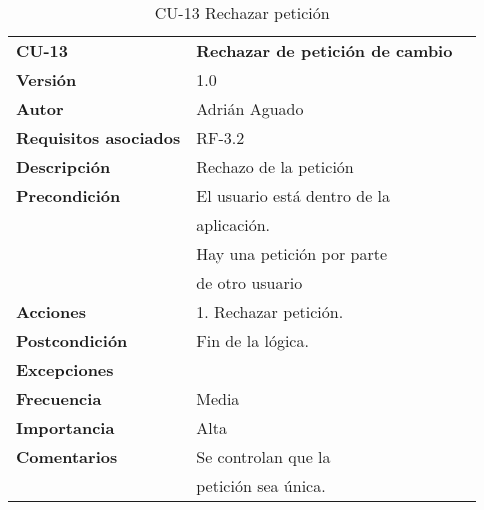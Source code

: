 \begin{table}
\begin{tabular}{llr}  
\toprule
\begin{minipage}[b]{0.24\columnwidth}\raggedright\strut
\textbf{CU-13}\strut
\end{minipage} & \begin{minipage}[b]{0.72\columnwidth}\raggedright\strut
\textbf{Rechazar de petición de cambio}\strut
\end{minipage}\tabularnewline
\cmidrule(r){1-2}
\textbf{Versión}       & 1.0           \\
\textbf{Autor}       & Adrián  Aguado    \\
\textbf{Requisitos asociados}       & RF-3.2 \\
\textbf{Descripción} & Rechazo de la petición\\
\textbf{Precondición}  & El usuario está dentro de la \\
& aplicación.      \\
& Hay una petición por parte \\
& de otro usuario \\
\textbf{Acciones} & 1. Rechazar petición. \\
\textbf{Postcondición} & Fin de la lógica. \\
\textbf{Excepciones} &     \\
\textbf{Frecuencia} & Media          \\
\textbf{Importancia} & Alta            \\
\textbf{Comentarios } & Se controlan que la       \\
& petición sea única. \\
\bottomrule
\end{tabular}
\caption{CU-13 Rechazar petición} 
\end{table}

